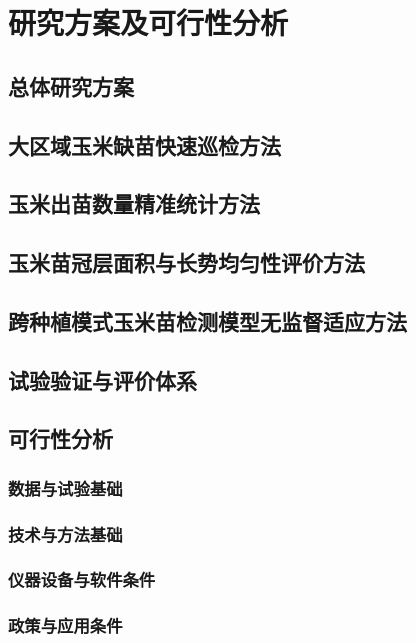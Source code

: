 \chapter{研究方案及可行性分析}

\section{总体研究方案}

\section{大区域玉米缺苗快速巡检方法}

\section{玉米出苗数量精准统计方法}

\section{玉米苗冠层面积与长势均匀性评价方法}

\section{跨种植模式玉米苗检测模型无监督适应方法}

\section{试验验证与评价体系}

\section{可行性分析}
\subsection{数据与试验基础}

\subsection{技术与方法基础}

\subsection{仪器设备与软件条件}

\subsection{政策与应用条件}
